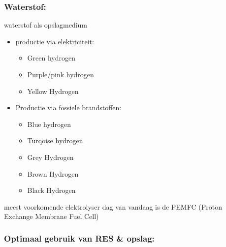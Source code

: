 \documentclass[12pt]{article}
\begin{document}
\subsubsection{Waterstof:}
waterstof als opslagmedium\begin{itemize}
    \item productie via elektriciteit:\begin{itemize}
        \item Green hydrogen
        \item Purple/pink hydrogen 
        \item Yellow Hydrogen
    \end{itemize}
    \item Productie via fossiele brandstoffen:\begin{itemize}
        \item Blue hydrogen 
        \item Turqoise hydrogen 
        \item Grey Hydrogen 
        \item Brown Hydrogen 
        \item Black Hydrogen
    \end{itemize}
\end{itemize}
meest voorkomende elektrolyser dag van vandaag is de PEMFC (Proton Exchange Membrane Fuel Cell)
\subsubsection{Optimaal gebruik van RES \& opslag:}
\end{document}
